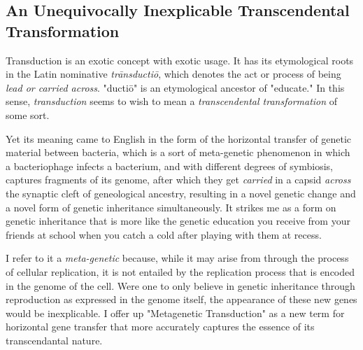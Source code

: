 \documentclass[runningheads]{llncs}
\begin{document}
\subsection{An Unequivocally Inexplicable Transcendental Transformation}


Transduction is an exotic concept with exotic usage. It has its etymological roots in the Latin nominative \emph{trānsductiō}, which denotes the act or process of being \emph{lead or carried across}. "ductiō" is an etymological ancestor of "educate." In this sense, \emph{transduction} seems to wish to mean a \emph{transcendental transformation} of some sort. 

Yet its meaning came to English in the form of the horizontal transfer of genetic material between bacteria, which is a sort of meta-genetic phenomenon in which a bacteriophage infects a bacterium, and with different degrees of symbiosis, captures fragments of its genome, after which they get \emph{carried} in a capsid \emph{across} the synaptic cleft of geneological ancestry, resulting in a novel genetic change and a novel form of genetic inheritance simultaneously. It strikes me as a form on genetic inheritance that is more like the genetic education you receive from your friends at school when you catch a cold after playing with them at recess.

I refer to it a \emph{meta-genetic} because, while it may arise from through the process of cellular replication, it is not entailed by the replication process that is encoded in the genome of the cell. Were one to only believe in genetic inheritance through reproduction as expressed in the genome itself, the appearance of these new genes would be inexplicable. I offer up "Metagenetic Transduction" as a new term for horizontal gene transfer that more accurately captures the essence of its transcendantal nature. 
\end{document}
